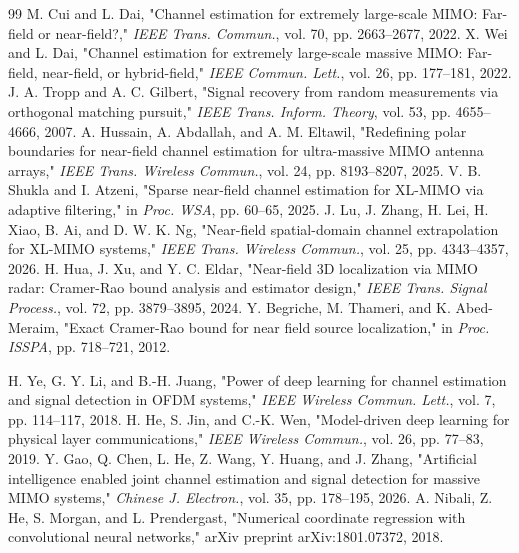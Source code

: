 \documentclass[journal]{IEEEtran}
\begin{document}
\begin{thebibliography}{99}
M. Cui and L. Dai, "Channel estimation for extremely large-scale MIMO: Far-field or near-field?," \emph{IEEE Trans. Commun.}, vol. 70, pp. 2663--2677, 2022.
X. Wei and L. Dai, "Channel estimation for extremely large-scale massive MIMO: Far-field, near-field, or hybrid-field," \emph{IEEE Commun. Lett.}, vol. 26, pp. 177--181, 2022.
J. A. Tropp and A. C. Gilbert, "Signal recovery from random measurements via orthogonal matching pursuit," \emph{IEEE Trans. Inform. Theory}, vol. 53, pp. 4655--4666, 2007.
A. Hussain, A. Abdallah, and A. M. Eltawil, "Redefining polar boundaries for near-field channel estimation for ultra-massive MIMO antenna arrays," \emph{IEEE Trans. Wireless Commun.}, vol. 24, pp. 8193--8207, 2025.
V. B. Shukla and I. Atzeni, "Sparse near-field channel estimation for XL-MIMO via adaptive filtering," in \emph{Proc. WSA}, pp. 60--65, 2025.
J. Lu, J. Zhang, H. Lei, H. Xiao, B. Ai, and D. W. K. Ng, "Near-field spatial-domain channel extrapolation for XL-MIMO systems," \emph{IEEE Trans. Wireless Commun.}, vol. 25, pp. 4343--4357, 2026.
H. Hua, J. Xu, and Y. C. Eldar, "Near-field 3D localization via MIMO radar: Cramer-Rao bound analysis and estimator design," \emph{IEEE Trans. Signal Process.}, vol. 72, pp. 3879--3895, 2024.
Y. Begriche, M. Thameri, and K. Abed-Meraim, "Exact Cramer-Rao bound for near field source localization," in \emph{Proc. ISSPA}, pp. 718--721, 2012.

H. Ye, G. Y. Li, and B.-H. Juang, "Power of deep learning for channel estimation and signal detection in OFDM systems," \emph{IEEE Wireless Commun. Lett.}, vol. 7, pp. 114--117, 2018.
H. He, S. Jin, and C.-K. Wen, "Model-driven deep learning for physical layer communications," \emph{IEEE Wireless Commun.}, vol. 26, pp. 77--83, 2019.
Y. Gao, Q. Chen, L. He, Z. Wang, Y. Huang, and J. Zhang, "Artificial intelligence enabled joint channel estimation and signal detection for massive MIMO systems," \emph{Chinese J. Electron.}, vol. 35, pp. 178--195, 2026.
A. Nibali, Z. He, S. Morgan, and L. Prendergast, "Numerical coordinate regression with convolutional neural networks," arXiv preprint arXiv:1801.07372, 2018.
\end{thebibliography}
\end{document}
